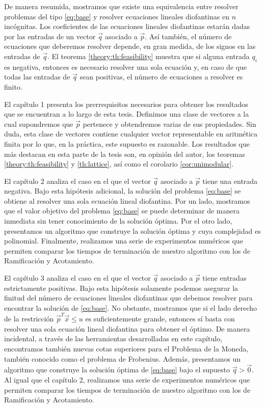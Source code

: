 De manera resumida, mostramos que existe una equivalencia entre resolver problemas del tipo
\eqref{eq:base} y resolver ecuaciones lineales diofantinas en $n$ incógnitas. Los coeficientes de
las ecuaciones lineales diofantinas estarán dadas por las entradas de un vector $\vec{q}$ asociado a
$\vec{p}$. Así también, el número de ecuaciones que deberemos resolver depende, en gran medida, de
los signos en las entradas de $\vec{q}$. El teorema \ref{theory:th:feasibility} muestra que si
alguna entrada $q_i$ es negativa, entonces es necesario resolver una sola ecuación y, en caso de que
todas las entradas de $\vec{q}$ sean positivas, el número de ecuaciones a resolver es finito.

El capítulo 1 presenta los prerrequisitos necesarios para obtener los resultados que se encuentran a
lo largo de esta tesis. Definimos una clase de vectores a la cual supondremos que $\vec{p}$
pertenece y obtendremos varias de sus propiedades. Sin duda, esta clase de vectores contiene
cualquier vector representable en aritmética finita por lo que, en la práctica, este supuesto es
razonable. Los resultados que más destacan en esta parte de la tesis son, en opinión del autor, los
teoremas \ref{theory:th:feasibility} y \ref{th:lattice}, así como el corolario \ref{cor:unimodular}.

El capítulo 2 analiza el caso en el que el vector $\vec{q}$ asociado a $\vec{p}$ tiene una entrada
negativa. Bajo esta hipótesis adicional, la solución del problema \eqref{eq:base} se obtiene al
resolver una sola ecuación lineal diofantina. Por un lado, mostramos que el valor objetivo del
problema \eqref{eq:base} se puede determinar de manera inmediata sin tener conocimiento de la
solución óptima. Por el otro lado, presentamos un algoritmo que construye la solución óptima y cuya
complejidad es polinomial. Finalmente, realizamos una serie de experimentos numéricos que permiten
comparar los tiempos de terminación de nuestro algoritmo con los de Ramificación y Acotamiento.

El capítulo 3 analiza el caso en el que el vector $\vec{q}$ asociado a $\vec{p}$ tiene entradas
estrictamente positivas. Bajo esta hipótesis solamente podemos asegurar la finitud del número de
ecuaciones lineales diofantinas que debemos resolver para encontrar la solución de \eqref{eq:base}.
No obstante, mostramos que si el lado derecho de la restricción $\vec{p}^T\vec{x} \leq u$ es
suficientemente grande, entonces sí basta con resolver una sola ecuación lineal diofantina para
obtener el óptimo. De manera incidental, a través de las herramientas desarrolladas en este
capítulo, encontramos también nuevas cotas superiores para el Problema de la Moneda, también
conocido como el problema de Frobenius. Además, presentamos un algoritmo que construye la solución
óptima de \eqref{eq:base} bajo el supuesto $\vec{q} > \vec{0}$. Al igual que el capítulo 2,
realizamos una serie de experimentos numéricos que permiten comparar los tiempos de terminación de
nuestro algoritmo con los de Ramificación y Acotamiento.


